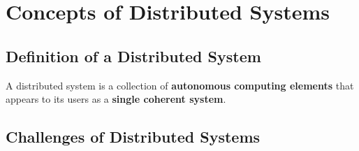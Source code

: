 \section{Concepts of Distributed Systems}

\subsection{Definition of a Distributed System}

A distributed system is a collection of \textbf{autonomous computing elements} that appears to its users as a \textbf{single coherent system}.

\subsection{Challenges of Distributed Systems}

